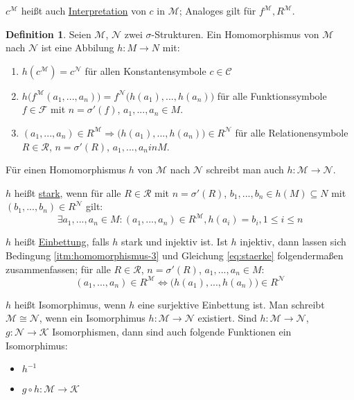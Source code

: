 \documentclass{article}
\theoremstyle{definition}
\newtheorem{dfn}{Definition}
\newcommand{\calC}{\mathcal{C}}
\newcommand{\calF}{\mathcal{F}}
\newcommand{\calK}{\mathcal{K}}
\newcommand{\calM}{\mathcal{M}}
\newcommand{\calN}{\mathcal{N}}
\newcommand{\calR}{\mathcal{R}}
\begin{document}
    $ c^\calM $ heißt auch \underline{Interpretation} von $ c $ in $ \calM $; Analoges gilt für $ f^\calM, R^\calM $.

    \begin{dfn}
        Seien $ \calM $, $ \calN $ zwei $ \sigma $-Strukturen.
        Ein Homomorphismus von $ \calM $ nach $ \calN $ ist eine Abbilung $ h : M \rightarrow N $ mit:
        \begin{enumerate}
            \item $ h(c^\calM) = c^\calN $ für allen Konstantensymbole $ c \in \calC $
            \item $ h\big(f^\calM(a_1, ..., a_n)\big) = f^\calN\big(h(a_1), ..., h(a_n)\big) $ für alle Funktionssymbole $ f \in \calF $ mit $ n = \sigma'(f) $, $ a_1, ..., a_n \in M $.
            \item \label{itm:homomorphismus-3} $ (a_1, ..., a_n) \in R^\calM \Rightarrow \big(h(a_1), ..., h(a_n)) \in R^\calN $ für alle Relationensymbole $ R \in \calR $, $ n = \sigma'(R) $, $ a_1, ..., a_n in M $.
        \end{enumerate}
    \end{dfn}

    Für einen Homomorphismus $ h $ von $ \calM $ nach $ \calN $ schreibt man auch $ h : \calM \rightarrow \calN $.

    $ h $ heißt \underline{stark}, wenn für alle $ R \in \calR $ mit $ n = \sigma'(R) $, $ b_1, ..., b_n \in h(M) \subseteq N $ mit $ (b_1, ..., b_n) \in R^\calN $ gilt:
    \begin{equation}
        \label{eq:staerke}
        \exists a_1, ..., a_n \in M : (a_1, ..., a_n) \in R^\calM, h(a_i) = b_i, 1 \leq i \leq n
    \end{equation}

    $ h $ heißt \underline{Einbettung}, falls $ h $ stark und injektiv ist.
    Ist $ h $ injektiv, dann lassen sich Bedingung \ref{itm:homomorphismus-3} und Gleichung \eqref{eq:staerke} folgendermaßen zusammenfassen; für alle $ R \in \calR $, $ n = \sigma'(R) $, $ a_1, ..., a_n \in M $:
    \begin{equation}
        (a_1, ..., a_n) \in R^\calM \Leftrightarrow \big(h(a_1), ..., h(a_n)\big) \in R^\calN
    \end{equation}

    $ h $ heißt Isomorphimus, wenn $ h $ eine surjektive Einbettung ist.
    Man schreibt $ \calM \cong \calN $, wenn ein Isomorphimus $ h : \calM \rightarrow \calN $ existiert.
    Sind $ h : \calM \rightarrow \calN $, $ g : \calN \rightarrow \calK $ Isomorphismen, dann sind auch folgende Funktionen ein Isomorphimus:
    \begin{itemize}
        \item $ h^{-1} $
        \item $ g \circ h : \calM \rightarrow \calK $
    \end{itemize}
\end{document}
